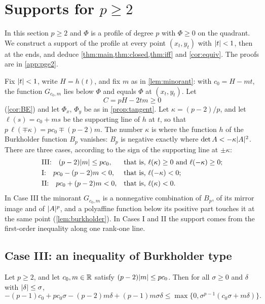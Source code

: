 \section{Supports for \texorpdfstring{$p\ge2$}{p >= 2}}\label{sec:pge2}

In this section $p\ge2$ and $\Phi$ is a profile of degree $p$ with $\Phi\ge0$ on the quadrant.
We construct a support of the profile at every point $(x_t,y_t)$ with $\lvert t\rvert<1$, then at the
ends, and deduce \cref{thm:main,thm:closed,thm:iff} and \cref{cor:equiv}. The proofs are in
\cref{app:pge2}.

Fix $\lvert t\rvert<1$, write $H=h(t)$, and fix $m$ as in \cref{lem:minorant}: with $c_0=H-mt$, the
function $G_{c_0,m}$ lies below $\Phi$ and equals $\Phi$ at $(x_t,y_t)$. Let
\[
  C=pH-2tm\ge0
\]
(\cref{cor:BE}) and let $\Phi_x$, $\Phi_y$ be as in \cref{prop:tangent}. Let $\kappa=(p-2)/p$,
and let $\ell(s)=c_0+ms$ be the supporting line of $h$ at $t$, so that
$p\,\ell(\mp\kappa)=pc_0\mp(p-2)m$. The number $\kappa$ is where the function $h$ of the
Burkholder function $B_p$ vanishes: $B_p$ is negative exactly where $\det A<-\kappa\lvert A\rvert^2$.
There are three cases, according to the sign of the supporting line at $\pm\kappa$:
\begin{align*}
  &\text{III:}\quad (p-2)\lvert m\rvert\le pc_0,&&\text{that is, }\ell(\kappa)\ge0\text{ and }\ell(-\kappa)\ge0;\\
  &\text{I:}\quad pc_0-(p-2)m<0,&&\text{that is, }\ell(-\kappa)<0;\\
  &\text{II:}\quad pc_0+(p-2)m<0,&&\text{that is, }\ell(\kappa)<0.
\end{align*}
In Case III the minorant $G_{c_0,m}$ is a nonnegative combination of $B_p$, of its mirror image
and of $\lvert A\rvert^p$, and a polyaffine function below its positive part touches it at the same
point (\cref{lem:burkholder}). In Cases I and II the support comes from the first-order
inequality along one rank-one line.

\subsection{Case III: an inequality of Burkholder type}\label{sec:caseIII}

\begin{lemma}\label{lem:burkholder}
Let $p\ge2$, and let $c_0,m\in\mathbb{R}$ satisfy $(p-2)\lvert m\rvert\le pc_0$. Then for all $\sigma\ge0$ and
$\delta$ with $\lvert \delta\rvert\le\sigma$,
\begin{equation}\label{eq:burkholder}
  -(p-1)c_0+pc_0\sigma-(p-2)m\delta+(p-1)m\sigma\delta\le
  \max\bigl\{0,\sigma^{p-1}(c_0\sigma+m\delta)\bigr\}.
\end{equation}
\end{lemma}

